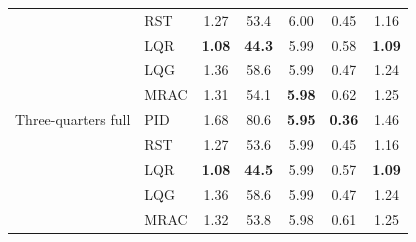 \begin{table}[!ht]
\begin{tabular}{llccccc}
 & RST & 1.27 & 53.4 & 6.00 & 0.45 & 1.16 \\
 & LQR & \textbf{1.08} & \textbf{44.3} & 5.99 & 0.58 & \textbf{1.09} \\
 & LQG & 1.36 & 58.6 & 5.99 & 0.47 & 1.24 \\
 & MRAC & 1.31 & 54.1 & \textbf{5.98} & 0.62 & 1.25 \\
\addlinespace[2pt]
Three-quarters full & PID & 1.68 & 80.6 & \textbf{5.95} & \textbf{0.36} & 1.46 \\
 & RST & 1.27 & 53.6 & 5.99 & 0.45 & 1.16 \\
 & LQR & \textbf{1.08} & \textbf{44.5} & 5.99 & 0.57 & \textbf{1.09} \\
 & LQG & 1.36 & 58.6 & 5.99 & 0.47 & 1.24 \\
 & MRAC & 1.32 & 53.8 & 5.98 & 0.61 & 1.25 \\
\bottomrule
\end{tabular}
\end{table}